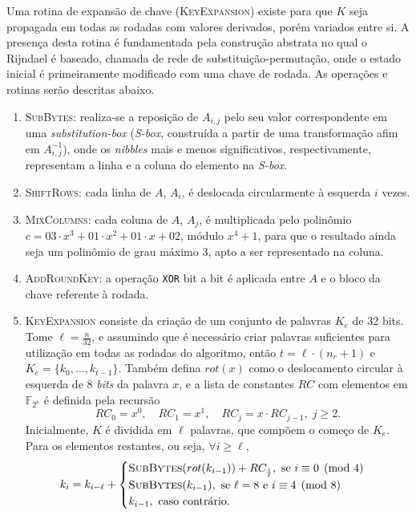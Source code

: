\documentclass[12pt]{report}
\begin{document}
Uma rotina de expansão de chave (\textsc{KeyExpansion}) existe
para que $K$ seja propagada em todas as rodadas com valores derivados,
porém variados entre si. A presença desta rotina é fundamentada pela
construção abstrata no qual o Rijndael é baseado, chamada de rede de
substituição-permutação, onde o estado inicial é primeiramente modificado
com uma chave de rodada. As operações e rotinas serão descritas abaixo.

\begin{enumerate}[label=\roman*.]

  \item \textsc{SubBytes}: realiza-se a reposição de $A_{i,j}$ pelo seu valor
      correspondente em uma \emph{substitution-box} (\emph{S-box}, construída a
        partir de uma transformação afim em $A_{i,j}^{-1}$),
        onde os \emph{nibbles} mais e menos significativos,
        respectivamente, representam a linha e a coluna do elemento na
        \emph{S-box}.

  \item \textsc{ShiftRows}: cada linha de $A$, $A_i$, é deslocada circularmente
      à esquerda $i$ vezes.

  \item \textsc{MixColumns}: cada coluna de $A$, $A_j$, é multiplicada pelo
      polinômio $c = 03 \cdot x^{3} + 01 \cdot x^{2} + 01 \cdot x + 02$, módulo
        $x^{4} + 1$, para que o resultado ainda seja um polinômio de grau
        máximo 3, apto a ser representado na coluna.

  \item \textsc{AddRoundKey}: a operação \texttt{XOR} bit a bit é aplicada
      entre $A$ e o bloco da chave referente à rodada.

  \item \textsc{KeyExpansion} consiste da criação de um conjunto de palavras $K_e$ de
32 bits.  Tome $\ell = \frac{n}{32}$, e assumindo que é necessário criar
palavras suficientes para utilização em todas as rodadas do algoritmo, então $t
= \ell \cdot (n_r + 1)$ e $K_e = \{k_0, \dots, k_{t - 1}\}$. Também defina
$rot(x)$ como o deslocamento circular à esquerda de 8 \emph{bits} da palavra $x$, e a
lista de constantes $RC$ com elementos em $\mathbb{F}_{2^{8}}$ é definida pela
recursão 
\begin{equation}
RC_0 = x^0, \quad RC_1 = x^1, \quad RC_j = x \cdot RC_{j-1}, \; j \geq 2.
\end{equation}
Inicialmente, $K$ é dividida em $\ell$ palavras, que compõem o começo de $K_e$.
Para os elementos restantes, ou seja, $\forall i \geq \ell$,
\begin{equation}
  k_{i} = k_{i - \ell} + 
    \begin{cases}
      \textsc{SubBytes}(rot(k_{i - 1})) + RC_{\frac{i}{\ell}},
        \text{ se } i \equiv 0 \pmod{4} \\
      \textsc{SubBytes}(k_{i - 1}),
        \text{ se } \ell = 8 \text { e } i \equiv 4 \pmod{8} \\
      k_{i - 1}, \text{ caso contrário.}
    \end{cases}
\end{equation}
\end{enumerate}
\end{document}
